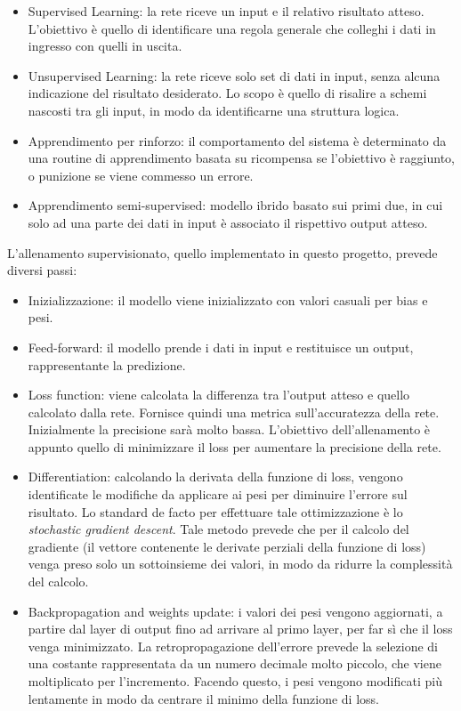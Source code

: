 \documentclass{article}
\begin{document}
\begin{itemize}
\item Supervised Learning: la rete riceve un input e il relativo risultato atteso. L'obiettivo è quello di identificare una regola generale che colleghi i dati in ingresso con quelli in uscita.
\item Unsupervised Learning: la rete riceve solo set di dati in input, senza alcuna indicazione del risultato desiderato. Lo scopo è quello di risalire a schemi nascosti tra gli input, in modo da identificarne una struttura logica.
\item Apprendimento per rinforzo: il comportamento del sistema è determinato da una routine di apprendimento basata su ricompensa se l'obiettivo è raggiunto, o punizione se viene commesso un errore.
\item Apprendimento semi-supervised: modello ibrido basato sui primi due, in cui solo ad una parte dei dati in input è associato il rispettivo output atteso.
\end{itemize}

L'allenamento supervisionato, quello implementato in questo progetto, prevede diversi passi:
\begin{itemize}
\item Inizializzazione: il modello viene inizializzato con valori casuali per bias e pesi. 
\item Feed-forward: il modello prende i dati in input e restituisce un output, rappresentante la predizione.
\item Loss function: viene calcolata la differenza tra l'output atteso e quello calcolato dalla rete. Fornisce quindi una metrica sull'accuratezza della rete.  Inizialmente la precisione sarà molto bassa. L'obiettivo dell'allenamento è appunto quello di minimizzare il loss per aumentare la precisione della rete. 
\item Differentiation: calcolando la derivata della funzione di loss, vengono identificate le modifiche da applicare ai pesi per diminuire l'errore sul risultato. Lo standard de facto per effettuare tale ottimizzazione è lo \textit{stochastic gradient descent}. Tale metodo prevede che per il calcolo del gradiente (il vettore contenente le derivate perziali della funzione di loss) venga preso solo un sottoinsieme dei valori, in modo da ridurre la complessità del calcolo.  
\item Backpropagation and weights update: i valori dei pesi vengono aggiornati, a partire dal layer di output fino ad arrivare al primo layer, per far sì che il loss venga minimizzato. La retropropagazione dell'errore prevede la selezione di una costante rappresentata da un numero decimale molto piccolo, che viene moltiplicato per l'incremento. Facendo questo, i pesi vengono modificati più lentamente in modo da centrare il minimo della funzione di loss.
\end{itemize}
\end{document}
